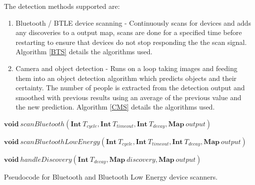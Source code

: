 \documentclass{l4proj}
\begin{document}
The detection methods supported are:
\begin{enumerate}
  \item Bluetooth / BTLE device scanning -  Continuously scans for devices and adds any discoveries to a output map, scans are done for a specified time before restarting to ensure that devices do not stop responding the the scan signal. Algorithm \ref{BTS} details the algorithms used.
  \item Camera and object detection -  Runs on a loop taking images and feeding them into an object detection algorithm which predicts objects and their certainty. The number of people is extracted from the detection output and smoothed with previous results using an average of the previous value and the new prediction. Algorithm \ref{CMS} details the algorithms used.
\end{enumerate}



\begin{algorithm}
\DontPrintSemicolon
\nl $\textbf{void}~scanBluetooth(\textbf{Int}~T_{cycle}, \textbf{Int}~T_{timeout}, \textbf{Int}~T_{decay}, \textbf{Map}~output)$ \;
\nl {}
\;

\nl $\textbf{void}~scanBluetoothLowEnergy(\textbf{Int}~T_{cycle}, \textbf{Int}~T_{timeout}, \textbf{Int}~T_{decay}, \textbf{Map}~output)$ \;
\nl {}
\;

\nl $\textbf{void}~handleDiscovery(\textbf{Int}~T_{decay}, \textbf{Map}~discovery, \textbf{Map}~output)$ \;
\nl {}
\;
\caption{Pseudocode for Bluetooth and Bluetooth Low Energy device scanners.}
\label{BTS}
\end{algorithm}
\end{document}
